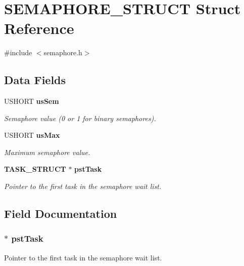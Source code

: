 \section{SEMAPHORE\_\-STRUCT Struct Reference}
\label{struct_s_e_m_a_p_h_o_r_e___s_t_r_u_c_t}


{\ttfamily \#include $<$semaphore.h$>$}\subsection*{Data Fields}
\begin{DoxyCompactItemize}
\item 
USHORT {\bf usSem}
\begin{DoxyCompactList}\small\item\em Semaphore value (0 or 1 for binary semaphores). \item\end{DoxyCompactList}\item 
USHORT {\bf usMax}
\begin{DoxyCompactList}\small\item\em Maximum semaphore value. \item\end{DoxyCompactList}\item 
{\bf TASK\_\-STRUCT} $\ast$ {\bf pstTask}
\begin{DoxyCompactList}\small\item\em Pointer to the first task in the semaphore wait list. \item\end{DoxyCompactList}\end{DoxyCompactItemize}


\subsection{Field Documentation}
\subsubsection[{pstTask}]{$\ast$ {\bf pstTask}}\label{struct_s_e_m_a_p_h_o_r_e___s_t_r_u_c_t_a4618a48c8e1a4c67b6f49bf6e75b510d}


Pointer to the first task in the semaphore wait list. 
